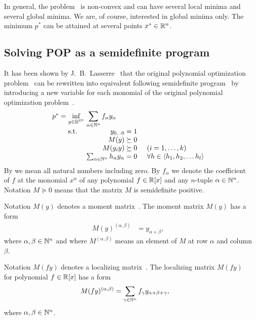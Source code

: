 In general, the problem~ is non-convex and can have several local minima and several global minima.
We are, of course, interested in global minima only.
The minimum $p^*$ can be attained at several points $x^*\in\mathbb{R}^n$.

\subsection{Solving POP as a semidefinite program}
It has been shown by J.~B.~Lasserre~\cite{Lasserre} that the original polynomial optimization problem~ can be rewritten into equivalent following semidefinite program~ by introducing a new variable for each monomial of the original polynomial optimization problem~.
\begin{align}
  \arraycolsep=1.4pt
  \begin{array}{rclrcl@{\hskip0.5cm}l}
    p^* &=& \displaystyle \inf_{y\in\R^{\N^n}} & \multicolumn{3}{l}{\displaystyle \sum_{\alpha\in\N^n}{f}_\alpha y_\alpha} \\
    && \text{s.t.} & y_{0\ldots0} &=& 1\\
    &&& M(y) &\succeq& 0\\
    &&& M(g_iy) &\succeq& 0 & (i = 1,\ldots,k) \\
    &&& \sum_{\alpha\in\N^n}h_\alpha y_\alpha &=& 0 & \forall h \in \langle h_1, h_2, \ldots h_l \rangle
  \end{array}\labeleq{pol:lass:sdp}
\end{align}
By \N{} we mean all natural numbers including zero.
By $f_\alpha$ we denote the coefficient of $f$ at the monomial $x^\alpha$ of any polynomial $f\in\mathbb{R}[x]$ and any $n$-tuple $\alpha\in\mathbb{N}^n$.
Notation $M\succeq0$ means that the matrix $M$ is semidefinite positive.

Notation $M(y)$ denotes a moment matrix~\cite[page 53]{SOS}.
The moment matrix $M(y)$ has a form
\begin{align}
  M(y)^{(\alpha,\beta)} &= y_{\alpha+\beta},
\end{align}
where $\alpha, \beta\in\mathbb{N}^n$ and where $M^{(\alpha,\beta)}$ means an element of $M$ at row $\alpha$ and column $\beta$.

Notation $M(fy)$ denotes a localizing matrix~\cite[page 53]{SOS}.
The localizing matrix $M(fy)$ for polynomial $f\in\mathbb{R}[x]$ has a form
\begin{align}
  M(fy)^{(\alpha,\beta)} &= \sum_{\gamma\in\mathbb{N}^n}f_\gamma y_{\alpha+\beta+\gamma},
\end{align}
where $\alpha, \beta\in\mathbb{N}^n$.

